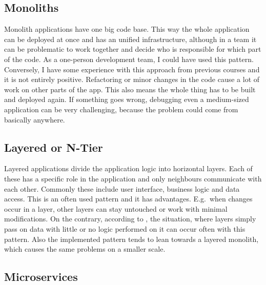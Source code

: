 \subsection{Monoliths}

Monolith applications have one big code base. This way the whole application can be deployed at once and has an unified infrastructure, although in a team it can be problematic to work together and decide who is responsible for which part of the code. As a one-person development team, I could have used this pattern. Conversely, I have some experience with this approach from previous courses and it is not entirely positive. Refactoring or minor changes in the code cause a lot of work on other parts of the app. This also means the whole thing has to be built and deployed again. If something goes wrong, debugging even a medium-sized application can be very challenging, because the problem could come from basically anywhere.

\subsection{Layered or N-Tier}

Layered applications divide the application logic into horizontal layers. Each of these has a specific role in the application and only neighbours communicate with each other. Commonly these include user interface, business logic and data access. This is an often used pattern and it has advantages. E.g.\ when changes occur in a layer, other layers can stay untouched or work with minimal modifications. On the contrary, according to \cite{Patterns}, the situation, where layers simply pass on data with little or no logic performed on it can occur often with this pattern. Also the implemented pattern tends to lean towards a layered monolith, which causes the same problems on a smaller scale.

\subsection{Microservices}

